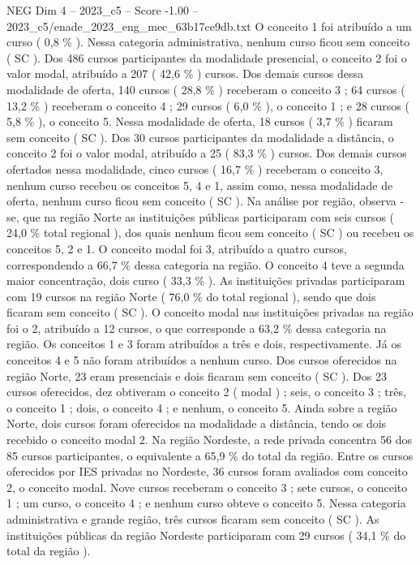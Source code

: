 \begin{textsample}{NEG Dim 4 – 2023\_c5 – Score -1.00 – 2023\_c5/enade\_2023\_eng\_mec\_63b17ce9db.txt}
O conceito 1 foi atribuído a um curso ( 0,8 \% ).
Nessa categoria administrativa, nenhum curso ficou sem conceito ( SC ).
Dos 486 cursos participantes da modalidade presencial, o conceito 2 foi o valor modal, atribuído a 207 ( 42,6 \% ) cursos.
Dos demais cursos dessa modalidade de oferta, 140 cursos ( 28,8 \% ) receberam o conceito 3 ; 64 cursos ( 13,2 \% ) receberam o conceito 4 ; 29 cursos ( 6,0 \% ), o conceito 1 ; e 28 cursos ( 5,8 \% ), o conceito 5.
Nessa modalidade de oferta, 18 cursos ( 3,7 \% ) ficaram sem conceito ( SC ).
Dos 30 cursos participantes da modalidade a distância, o conceito 2 foi o valor modal, atribuído a 25 ( 83,3 \% ) cursos.
Dos demais cursos ofertados nessa modalidade, cinco cursos ( 16,7 \% ) receberam o conceito 3, nenhum curso recebeu os conceitos 5, 4 e 1, assim como, nessa modalidade de oferta, nenhum curso ficou sem conceito ( SC ).
Na análise por região, observa -se, que na região Norte as instituições públicas participaram com seis cursos ( 24,0 \% total regional ), dos quais nenhum ficou sem conceito ( SC ) ou recebeu os conceitos 5, 2 e 1.
O conceito modal foi 3, atribuído a quatro cursos, correspondendo a 66,7 \% dessa categoria na região.
O conceito 4 teve a segunda maior concentração, dois curso ( 33,3 \% ).
As instituições privadas participaram com 19 cursos na região Norte ( 76,0 \% do total regional ), sendo que dois ficaram sem conceito ( SC ).
O conceito modal nas instituições privadas na região foi o 2, atribuído a 12 cursos, o que corresponde a 63,2 \% dessa categoria na região.
Os conceitos 1 e 3 foram atribuídos a três e dois, respectivamente.
Já os conceitos 4 e 5 não foram atribuídos a nenhum curso.
Dos cursos oferecidos na região Norte, 23 eram presenciais e dois ficaram sem conceito ( SC ).
Dos 23 cursos oferecidos, dez obtiveram o conceito 2 ( modal ) ; seis, o conceito 3 ; três, o conceito 1 ; dois, o conceito 4 ; e nenhum, o conceito 5.
Ainda sobre a região Norte, dois cursos foram oferecidos na modalidade a distância, tendo os dois recebido o conceito modal 2.
Na região Nordeste, a rede privada concentra 56 dos 85 cursos participantes, o equivalente a 65,9 \% do total da região.
Entre os cursos oferecidos por IES privadas no Nordeste, 36 cursos foram avaliados com conceito 2, o conceito modal.
Nove cursos receberam o conceito 3 ; sete cursos, o conceito 1 ; um curso, o conceito 4 ; e nenhum curso obteve o conceito 5.
Nessa categoria administrativa e grande região, três cursos ficaram sem conceito ( SC ).
As instituições públicas da região Nordeste participaram com 29 cursos ( 34,1 \% do total da região ).

\end{textsample}
